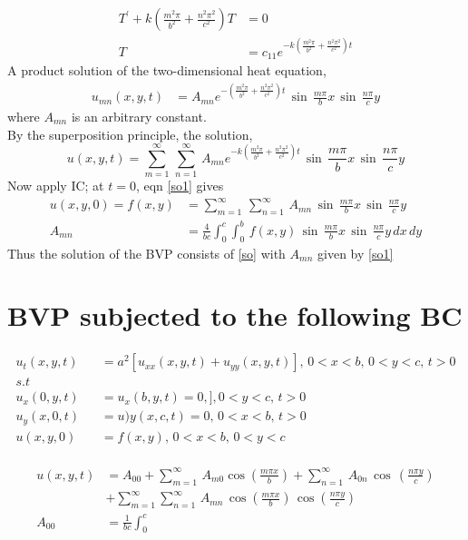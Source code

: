 \begin{align*}
T^{'}+k(\frac{m^2\pi}{b^2}+\frac{n^2\pi^2}{c^2})T&=0\\
T&=c_{11}e^{-k(\frac{m^2\pi}{b^2}+\frac{n^2\pi^2}{c^2})t}\label{hp10}
\end{align*}
A product solution of the two-dimensional heat equation,
\begin{align*}
u_{mn}(x,y,t)&=A_{mn}e^{-(\frac{m^2\pi}{b^2}+\frac{n^2\pi^2}{c^2})t}\,\sin\,\frac{m\pi}{b}x\,\sin\,\frac{n\pi}{c}y
\end{align*}
where $A_{mn}$ is an arbitrary constant.\\
By the superposition principle, the solution,
\begin{equation}
u(x,y,t)=\sum_{m=1}^\infty\,\sum_{n=1}^\infty\,A_{mn}e^{-k(\frac{m^2\pi}{b^2}+\frac{n^2\pi^2}{c^2})t}\,\sin\,\frac{m\pi}{b}x\,\sin\,\frac{n\pi}{c}y\label{so}
\end{equation}
Now apply IC; at $t=0$, eqn \eqref{so1} gives
\begin{align}
u(x,y,0)=f(x,y)&=\sum_{m=1}^\infty\,\sum_{n=1}^\infty\,A_{mn}\,\sin\,\frac{m\pi}{b}x\,\sin\,\frac{n\pi}{c}y\nonumber\\
A_{mn}&=\frac{4}{bc}\int_0^c\int_0^b\,f(x,y)\,\sin\,\frac{m\pi}{b}x\,\sin\,\frac{n\pi}{c}y\,dx\,dy\label{so1}
\end{align}
Thus the solution of the BVP consists of \eqref{so} with $A_{mn}$ given by \eqref{so1}
\section{BVP subjected to the following BC}
\begin{align*}
u_t(x,y,t)&=a^2[u_{xx}(x,y,t)+u_{yy}(x,y,t)],\,0<x<b,\,0<y<c,\,t>0\\
s.t\hspace{2cm}&\\
u_x(0,y,t)&=u_x(b,y,t)=0,],0<y<c,\,t>0\\
u_y(x,0,t)&=u)y(x,c,t)=0,\,0<x<b,\,t>0\\
u(x,y,0)&=f(x,y),\,0<x<b,\,0<y<c
\end{align*}
\\
\begin{align*}
u(x,y,t)&=A_{00}+\sum_{m=1}^\infty\,A_{m0}\cos\left(\frac{m\pi x}{b}\right)+\sum_{n=1}^\infty\,A_{0n}\,\cos\,\left(\frac{n\pi y}{c}\right)\\
&+\sum_{m=1}^\infty\sum_{n=1}^\infty\,A_{mn}\,\cos\left(\frac{m\pi x}{b}\right)\,\cos\left(\frac{n\pi y}{c}\right)\\
A_{00}&=\frac{1}{bc}\int_0^c
\end{align*}

